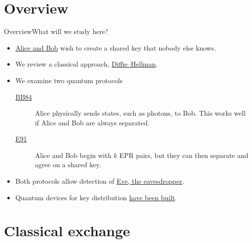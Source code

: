 
\section*{Overview}

\begin{frame}{Overview}{What will we study here?}

\begin{itemize}[<+->]
    \item \href{https://en.wikipedia.org/wiki/Alice_and_Bob}{Alice and Bob} wish to create a shared key that nobody else knows.
    \item We review a classical approach, \href{https://en.wikipedia.org/wiki/Diffie-Hellman_key_exchange}{Diffie--Hellman}.
    \item We examine two quantum protocols
    \begin{description}
       \item[\href{https://en.wikipedia.org/wiki/Quantum_key_distribution\#BB84_protocol:_Charles_H._Bennett_and_Gilles_Brassard_(1984)}{BB84}] Alice physically sends states, such as photons, to Bob.  This works well if Alice and Bob are always separated.
       \item[\href{https://en.wikipedia.org/wiki/Quantum_key_distribution\#E91_protocol:_Artur_Ekert_(1991)}{E91}] Alice and Bob begin with $k$ EPR pairs, but they can then separate and agree on a shared key.
    \end{description}
    \item Both protocols allow detection of \href{https://en.wikipedia.org/wiki/Eavesdropping}{Eve, the eavesdropper}.
    \item Quantum devices for key distribution \href{https://en.wikipedia.org/wiki/Quantum_key_distribution\#Implementations}{have been built}.
\end{itemize}
    
\end{frame}

\section*{Classical exchange}

